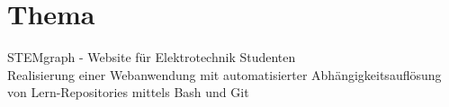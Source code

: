 \section{Thema}
STEMgraph - Website für Elektrotechnik Studenten \\ 
Realisierung einer Webanwendung mit automatisierter Abhängigkeitsauflösung von Lern-Repositories mittels Bash und Git